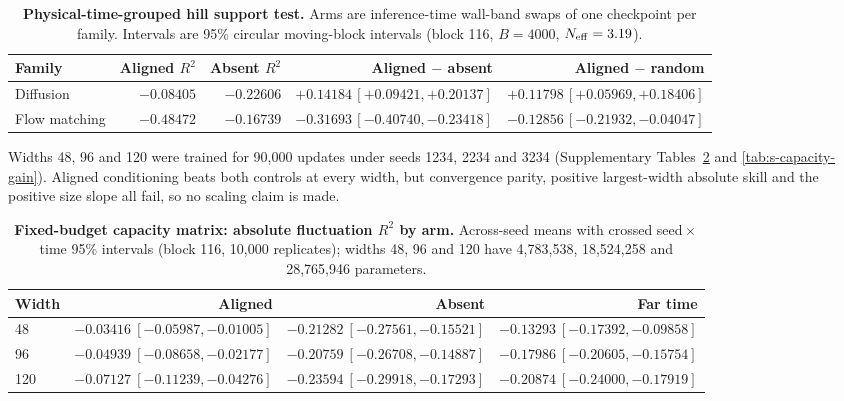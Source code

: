 \documentclass[11pt]{article}
\begin{document}
\begin{table}[h]
\centering
\footnotesize
\setlength{\tabcolsep}{2.5pt}
\begin{tabular}{@{}lrrrr@{}}
\toprule
Family & Aligned $R^2$ & Absent $R^2$ & Aligned $-$ absent & Aligned $-$ random \\
\midrule
Diffusion & $-0.08405$ & $-0.22606$ &
$+0.14184\,[+0.09421,+0.20137]$ & $+0.11798\,[+0.05969,+0.18406]$ \\
Flow matching & $-0.48472$ & $-0.16739$ &
$-0.31693\,[-0.40740,-0.23418]$ & $-0.12856\,[-0.21932,-0.04047]$ \\
\bottomrule
\end{tabular}
\caption{\textbf{Physical-time-grouped hill support test.} Arms are inference-time wall-band
swaps of one checkpoint per family. Intervals are 95\% circular moving-block intervals (block
116, $B=4000$, $N_{\rm eff}=3.19$).}\label{tab:s-groupedhill}
\end{table}

Widths 48, 96 and 120 were trained for 90,000 updates under seeds 1234, 2234 and 3234
(Supplementary Tables~\ref{tab:s-capacity-abs} and \ref{tab:s-capacity-gain}).
Aligned conditioning beats both controls at every width, but convergence parity, positive
largest-width absolute skill and the positive size slope all fail, so no scaling claim is made.

\begin{table}[h]
\centering
\footnotesize
\setlength{\tabcolsep}{4pt}
\begin{tabular}{@{}lrrr@{}}
\toprule
Width & Aligned & Absent & Far time \\
\midrule
48 & $-0.03416\ [-0.05987,-0.01005]$ & $-0.21282\ [-0.27561,-0.15521]$ &
$-0.13293\ [-0.17392,-0.09858]$ \\
96 & $-0.04939\ [-0.08658,-0.02177]$ & $-0.20759\ [-0.26708,-0.14887]$ &
$-0.17986\ [-0.20605,-0.15754]$ \\
120 & $-0.07127\ [-0.11239,-0.04276]$ & $-0.23594\ [-0.29918,-0.17293]$ &
$-0.20874\ [-0.24000,-0.17919]$ \\
\bottomrule
\end{tabular}
\caption{\textbf{Fixed-budget capacity matrix: absolute fluctuation $R^2$ by arm.} Across-seed
means with crossed seed\,$\times$\,time 95\% intervals (block 116, 10,000 replicates); widths
48, 96 and 120 have 4,783,538, 18,524,258 and 28,765,946 parameters.}
\label{tab:s-capacity-abs}
\end{table}
\end{document}
